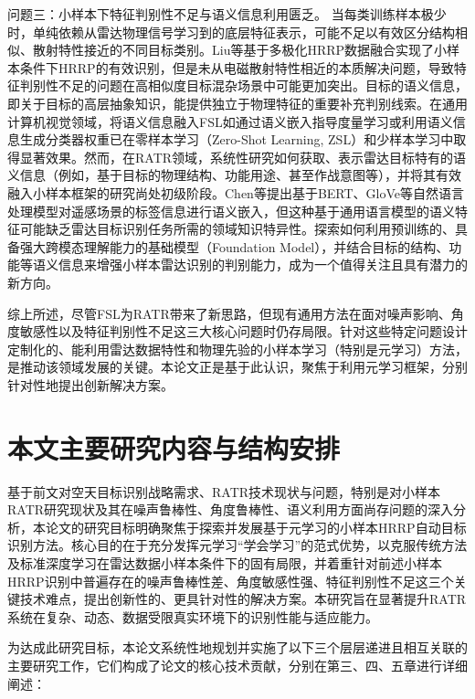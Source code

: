 问题三：小样本下特征判别性不足与语义信息利用匮乏。
当每类训练样本极少时，单纯依赖从雷达物理信号学习到的底层特征表示，可能不足以有效区分结构相似、散射特性接近的不同目标类别。Liu等基于多极化HRRP数据融合实现了小样本条件下HRRP的有效识别，但是未从电磁散射特性相近的本质解决问题，导致特征判别性不足的问题在高相似度目标混杂场景中可能更加突出。目标的语义信息，即关于目标的高层抽象知识，能提供独立于物理特征的重要补充判别线索。在通用计算机视觉领域，将语义信息融入FSL如通过语义嵌入指导度量学习或利用语义信息生成分类器权重已在零样本学习（Zero-Shot Learning, ZSL）和少样本学习中取得显著效果。然而，在RATR领域，系统性研究如何获取、表示雷达目标特有的语义信息（例如，基于目标的物理结构、功能用途、甚至作战意图等），并将其有效融入小样本框架的研究尚处初级阶段。Chen等提出基于BERT、GloVe等自然语言处理模型对遥感场景的标签信息进行语义嵌入，但这种基于通用语言模型的语义特征可能缺乏雷达目标识别任务所需的领域知识特异性。探索如何利用预训练的、具备强大跨模态理解能力的基础模型（Foundation Model），并结合目标的结构、功能等语义信息来增强小样本雷达识别的判别能力，成为一个值得关注且具有潜力的新方向。

综上所述，尽管FSL为RATR带来了新思路，但现有通用方法在面对噪声影响、角度敏感性以及特征判别性不足这三大核心问题时仍存局限。针对这些特定问题设计定制化的、能利用雷达数据特性和物理先验的小样本学习（特别是元学习）方法，是推动该领域发展的关键。本论文正是基于此认识，聚焦于利用元学习框架，分别针对性地提出创新解决方案。

\section{本文主要研究内容与结构安排}
\label{sec:structure} %
基于前文对空天目标识别战略需求、RATR技术现状与问题，特别是对小样本RATR研究现状及其在噪声鲁棒性、角度鲁棒性、语义利用方面尚存问题的深入分析，本论文的研究目标明确聚焦于探索并发展基于元学习的小样本HRRP自动目标识别方法。核心目的在于充分发挥元学习“学会学习”的范式优势，以克服传统方法及标准深度学习在雷达数据小样本条件下的固有局限，并着重针对前述小样本HRRP识别中普遍存在的噪声鲁棒性差、角度敏感性强、特征判别性不足这三个关键技术难点，提出创新性的、更具针对性的解决方案。本研究旨在显著提升RATR系统在复杂、动态、数据受限真实环境下的识别性能与适应能力。

为达成此研究目标，本论文系统性地规划并实施了以下三个层层递进且相互关联的主要研究工作，它们构成了论文的核心技术贡献，分别在第三、四、五章进行详细阐述：

